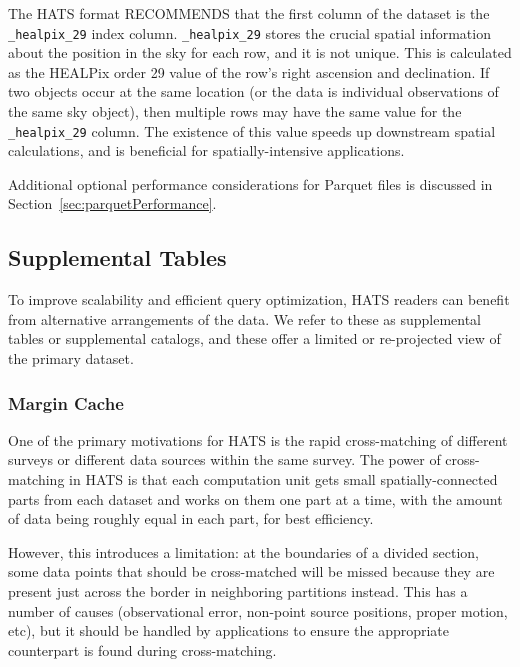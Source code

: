 \documentclass[11pt,a4paper]{ivoa}
\begin{document}
The HATS format RECOMMENDS that the first column of the dataset is the \texttt{\_healpix\_29} index column.  
\texttt{\_healpix\_29} stores the crucial spatial information about the position in the sky for each row, and it is not unique.
This is calculated as the HEALPix order 29 value of the row's right ascension and declination. 
If two objects occur at the same location (or the data is individual observations of the same sky object), then multiple rows may have the same value for the \texttt{\_healpix\_29} column.
The existence of this value speeds up downstream spatial calculations, and is beneficial for spatially-intensive applications.

Additional optional performance considerations for Parquet files is discussed in Section~\ref{sec:parquetPerformance}.

\subsection{Supplemental Tables} \label{sec:supplemental}

To improve scalability and efficient query optimization, HATS readers can benefit from alternative arrangements of the data. 
We refer to these as supplemental tables or supplemental catalogs, and these offer a limited or re-projected view of the primary dataset.

\subsubsection{Margin Cache} \label{sec:margin}

One of the primary motivations for HATS is the rapid cross-matching of different surveys or different data sources within the same survey. 
The power of cross-matching in HATS is that each computation unit gets small spatially-connected parts from each dataset and works on them one part at a time,
with the amount of data being roughly equal in each part, for best efficiency.\par 

However, this introduces a limitation: at the boundaries of a divided section, some data points that should be cross-matched will be missed because they are present just across the border in neighboring partitions instead.
This has a number of causes (observational error, non-point source positions, proper motion, etc), but it should be handled by applications to ensure the appropriate counterpart is found during cross-matching.\par
\end{document}
